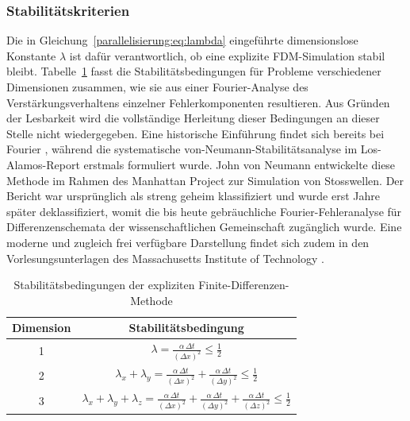 \subsubsection{Stabilitätskriterien}

Die in Gleichung~\eqref{parallelisierung:eq:lambda} eingeführte dimensionslose Konstante \(\lambda\) ist dafür verantwortlich, 
ob eine explizite FDM-Simulation stabil bleibt.  
Tabelle~\ref{parallelisierung:tab:stabilitaet_fdm} fasst die Stabilitätsbedingungen für Probleme verschiedener 
%
Dimensionen zusammen, wie sie aus einer Fourier-Analyse des Verstärkungsverhaltens einzelner Fehlerkomponenten 
%
resultieren.  
Aus Gründen der Lesbarkeit wird die vollständige Herleitung dieser Bedingungen an 
dieser Stelle nicht wiedergegeben.
Eine historische Einführung findet sich bereits bei Fourier \cite{parallelisierung:fourier1822}, während die systematische von-Neumann-Stabilitätsanalyse im Los-Alamos-Report \cite{parallelisierung:vonneumann1950} erstmals formuliert wurde. John von Neumann entwickelte diese Methode im Rahmen des Manhattan Project zur Simulation von Stosswellen. Der Bericht war ursprünglich als streng geheim klassifiziert und wurde erst Jahre später deklassifiziert, womit die bis heute gebräuchliche Fourier-Fehleranalyse für Differenzenschemata der wissenschaftlichen Gemeinschaft zugänglich wurde. Eine moderne und zugleich frei verfügbare Darstellung findet sich zudem in den Vorlesungsunterlagen des Massachusetts Institute of Technology \cite{parallelisierung:MITnotes2022}.
%
%
%
%

\label{parallelisierung:sec:stabilitaetskriterien}

\begin{table}
	\centering
	\caption{Stabilitätsbedingungen der expliziten Finite-Differenzen-Methode}
	\label{parallelisierung:tab:stabilitaet_fdm}
	\begin{tabular}{|c|c|}
		\hline
		\textbf{Dimension} & \textbf{Stabilitätsbedingung} \\
		\hline
		1 & 
		\( \displaystyle \lambda = \frac{\alpha \, \Delta t}{(\Delta x)^2} \leq \frac{1}{2} \) \\
		\hline
		2 & 
		\( \displaystyle \lambda_x + \lambda_y =
		\frac{\alpha \, \Delta t}{(\Delta x)^2} +
		\frac{\alpha \, \Delta t}{(\Delta y)^2} \leq \frac{1}{2} \) \\
		\hline
		3 & 
		\( \displaystyle \lambda_x + \lambda_y + \lambda_z =
		\frac{\alpha \, \Delta t}{(\Delta x)^2} +
		\frac{\alpha \, \Delta t}{(\Delta y)^2} +
		\frac{\alpha \, \Delta t}{(\Delta z)^2} \leq \frac{1}{2} \) \\
		\hline
	\end{tabular}
\end{table}



